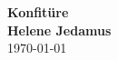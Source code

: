\begin{titlepage}
  \vspace*{10cm}
  \begin{center}
    {\Huge\bfseries Konfitüre} \\
    {\sf\Huge\bfseries Helene Jedamus} \\
    \today{}
  \end{center}
\end{titlepage}
\cleardoublepage

